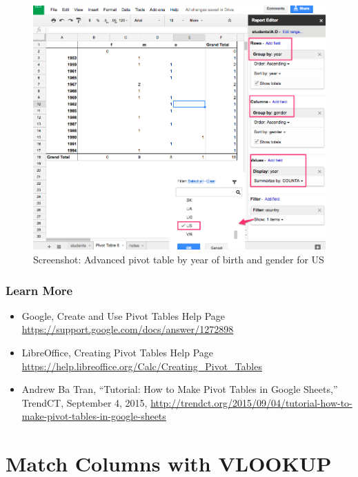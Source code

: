 \documentclass[
  english,
]{book}
\providecommand{\tightlist}{%
  \setlength{\itemsep}{0pt}\setlength{\parskip}{0pt}}
\begin{document}
\begin{figure}
\centering
\includegraphics{images/02-spreadsheet/spreadsheet-pivot-google-advanced.png}
\caption{Screenshot: Advanced pivot table by year of birth and gender for US}
\end{figure}

\hypertarget{learn-more-2}{%
\subsubsection*{Learn More}\label{learn-more-2}}

\begin{itemize}
\tightlist
\item
  Google, Create and Use Pivot Tables Help Page \url{https://support.google.com/docs/answer/1272898}
\item
  LibreOffice, Creating Pivot Tables Help Page \url{https://help.libreoffice.org/Calc/Creating_Pivot_Tables}
\item
  Andrew Ba Tran, ``Tutorial: How to Make Pivot Tables in Google Sheets,'' TrendCT, September 4, 2015, \url{http://trendct.org/2015/09/04/tutorial-how-to-make-pivot-tables-in-google-sheets}
\end{itemize}

\hypertarget{vlookup}{%
\section{Match Columns with VLOOKUP}\label{vlookup}}
\end{document}
